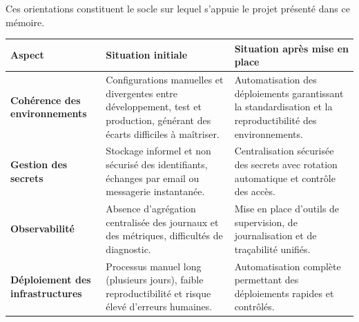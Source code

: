 Ces orientations constituent le socle sur lequel s'appuie le projet présenté dans ce mémoire.
\begin{table}[H]
	\centering
	\renewcommand{\arraystretch}{1.3}
	\begin{tabular}{|p{4cm}|p{5cm}|p{5cm}|}
		\hline
		\textbf{Aspect}                                                                                                              & \textbf{Situation initiale} & \textbf{Situation après mise en place} \\
		\hline

		\textbf{Cohérence des environnements}                                                                                        &
		Configurations manuelles et divergentes entre développement, test et production, générant des écarts difficiles à maîtriser. &
		Automatisation des déploiements garantissant la standardisation et la reproductibilité des environnements.                                                                                          \\
		\hline

		\textbf{Gestion des secrets}                                                                                                 &
		Stockage informel et non sécurisé des identifiants, échanges par email ou messagerie instantanée.                            &
		Centralisation sécurisée des secrets avec rotation automatique et contrôle des accès.                                                                                                               \\
		\hline

		\textbf{Observabilité}                                                                                                       &
		Absence d’agrégation centralisée des journaux et des métriques, difficultés de diagnostic.                                   &
		Mise en place d’outils de supervision, de journalisation et de traçabilité unifiés.                                                                                                                 \\
		\hline

		\textbf{Déploiement des infrastructures}                                                                                     &
		Processus manuel long (plusieurs jours), faible reproductibilité et risque élevé d’erreurs humaines.                         &
		Automatisation complète permettant des déploiements rapides et contrôlés.                                                                                                                           \\
		\hline


\end{tabular}
\end{table}
